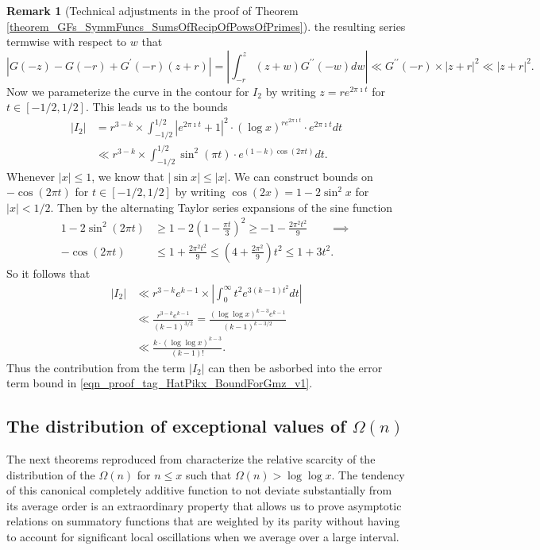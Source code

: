 \documentclass[11pt,reqno,a4letter]{article}
\numberwithin{figure}{section}
\numberwithin{table}{section}
\theoremstyle{plain}
\numberwithin{theorem}{section}
\theoremstyle{definition}
\newtheorem{remark}[theorem]{Remark}
\begin{document}
\begin{remark}[Technical adjustments in the proof of Theorem \ref{theorem_GFs_SymmFuncs_SumsOfRecipOfPowsOfPrimes}]
the resulting series termwise with respect to $w$ that 
\[
\left\lvert G(-z) - G(-r) + G^{\prime}(-r) (z+r) \right\rvert = 
     \left\lvert \int_{-r}^{z} (z+w) G^{\prime\prime}(-w) dw \right\rvert \ll 
     G^{\prime\prime}(-r) \times |z+r|^2 \ll |z+r|^2. 
\] 
Now we parameterize the curve in the contour for $I_2$ by writing 
$z = re^{2\pi\imath t}$ for $t \in [-1/2, 1/2]$. This leads us to the bounds 
\begin{align*} 
|I_2| & = r^{3-k} \times \int_{-1/2}^{1/2} |e^{2\pi\imath t} + 1|^2 \cdot 
     (\log x)^{r e^{2\pi\imath t}} \cdot e^{2\pi\imath t} dt \\ 
     & \ll r^{3-k} \times \int_{-1/2}^{1/2} \sin^2(\pi t) \cdot 
     e^{(1-k) \cos(2\pi t)} dt. 
\end{align*} 
Whenever $|x| \leq 1$, we know that $|\sin x| \leq |x|$. 
We can construct bounds on $-\cos(2\pi t)$ for 
$t \in [-1/2, 1/2]$ by writing $\cos(2x) = 1 - 2\sin^2 x$ for $|x| < 1/2$. 
Then by the alternating Taylor series expansions of the sine function 
\begin{align*} 
1-2\sin^2(2\pi t) & \geq 1 - 2 \left(1 - \frac{\pi t}{3}\right)^2 \geq -1 - \frac{2\pi^2 t^2}{9} 
     \qquad \implies \\ 
-\cos(2\pi t) & \leq 1 + \frac{2\pi^2 t^2}{9} \leq \left(4 + \frac{2\pi^2}{9}\right) t^2 \leq 1 + 3t^2. 
\end{align*} 
So it follows that 
\begin{align*} 
|I_2| & \ll r^{3-k} e^{k-1} \times \left\lvert \int_0^{\infty} t^2 e^{3(k-1) t^2} dt 
     \right\rvert \\ 
     & \ll \frac{r^{3-k} e^{k-1}}{(k-1)^{3/2}} = \frac{(\log\log x)^{k-3} e^{k-1}}{(k-1)^{k-3/2}} \\ 
     & \ll \frac{k \cdot (\log\log x)^{k-3}}{(k-1)!}. 
\end{align*} 
Thus the contribution from the term $|I_2|$ can then be asborbed into the error term bound 
in \eqref{eqn_proof_tag_HatPikx_BoundForGmz_v1}. 
\end{remark} 

\subsection{The distribution of exceptional values of $\Omega(n)$} 

The next theorems reproduced from \cite[\S 7.4]{MV} characterize the relative 
scarcity of the distribution of the $\Omega(n)$ for $n \leq x$ such that 
$\Omega(n) > \log\log x$. The tendency of this canonical completely additive 
function to not deviate substantially from its average order is an extraordinary 
property that allows us to prove asymptotic relations on summatory functions that 
are weighted by its parity without having to account for significant local 
oscillations when we average over a large interval. 
\end{document}
